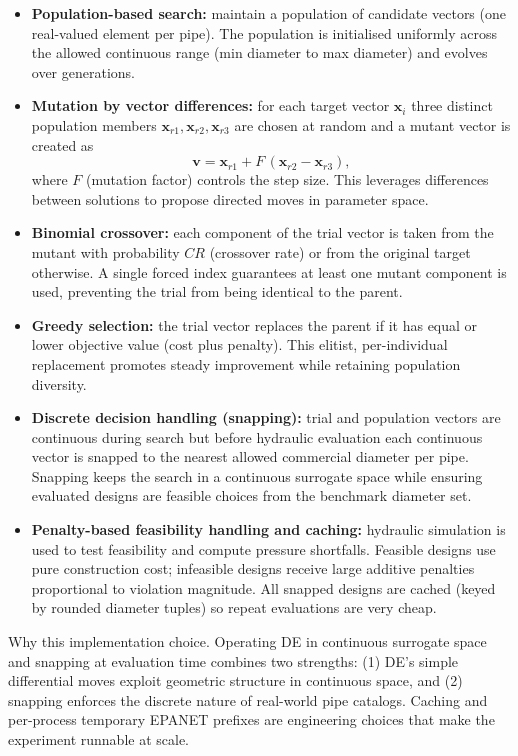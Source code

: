 \documentclass[12pt, a4paper]{article}
\begin{document}
\begin{itemize}
	\item \textbf{Population-based search:} maintain a population of candidate vectors (one real-valued element per pipe). The population is initialised uniformly across the allowed continuous range (min diameter to max diameter) and evolves over generations.
	\item \textbf{Mutation by vector differences:} for each target vector $\mathbf{x}_i$ three distinct population members $\mathbf{x}_{r1},\mathbf{x}_{r2},\mathbf{x}_{r3}$ are chosen at random and a mutant vector is created as
	      \[\mathbf{v}=\mathbf{x}_{r1} + F\,(\mathbf{x}_{r2}-\mathbf{x}_{r3}),\]
	      where $F$ (mutation factor) controls the step size. This leverages differences between solutions to propose directed moves in parameter space.
	\item \textbf{Binomial crossover:} each component of the trial vector is taken from the mutant with probability $CR$ (crossover rate) or from the original target otherwise. A single forced index guarantees at least one mutant component is used, preventing the trial from being identical to the parent.
	\item \textbf{Greedy selection:} the trial vector replaces the parent if it has equal or lower objective value (cost plus penalty). This elitist, per-individual replacement promotes steady improvement while retaining population diversity.
	\item \textbf{Discrete decision handling (snapping):} trial and population vectors are continuous during search but before hydraulic evaluation each continuous vector is snapped to the nearest allowed commercial diameter per pipe. Snapping keeps the search in a continuous surrogate space while ensuring evaluated designs are feasible choices from the benchmark diameter set.
	\item \textbf{Penalty-based feasibility handling and caching:} hydraulic simulation is used to test feasibility and compute pressure shortfalls. Feasible designs use pure construction cost; infeasible designs receive large additive penalties proportional to violation magnitude. All snapped designs are cached (keyed by rounded diameter tuples) so repeat evaluations are very cheap.
\end{itemize}

Why this implementation choice. Operating DE in continuous surrogate space and snapping at evaluation time combines two strengths: (1) DE's simple differential moves exploit geometric structure in continuous space, and (2) snapping enforces the discrete nature of real-world pipe catalogs. Caching and per-process temporary EPANET prefixes are engineering choices that make the experiment runnable at scale.
\end{document}
